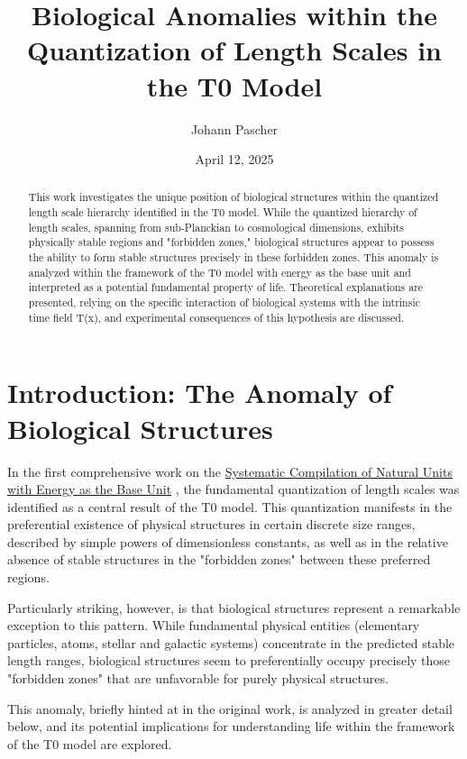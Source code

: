 \documentclass[12pt,a4paper]{article}
\title{Biological Anomalies within the\\Quantization of Length Scales in the T0 Model}
\author{Johann Pascher}
\date{April 12, 2025}
\newcommand{\Tfield}{T(x)}
\begin{document}
	
	\maketitle
	
	\begin{abstract}
		This work investigates the unique position of biological structures within the quantized length scale hierarchy identified in the T0 model. While the quantized hierarchy of length scales, spanning from sub-Planckian to cosmological dimensions, exhibits physically stable regions and "forbidden zones," biological structures appear to possess the ability to form stable structures precisely in these forbidden zones. This anomaly is analyzed within the framework of the T0 model with energy as the base unit and interpreted as a potential fundamental property of life. Theoretical explanations are presented, relying on the specific interaction of biological systems with the intrinsic time field \Tfield, and experimental consequences of this hypothesis are discussed.
	\end{abstract}
	
	\section{Introduction: The Anomaly of Biological Structures}
	\label{sec:introduction}
	
	In the first comprehensive work on the \href{https://github.com/jpascher/T0-Time-Mass-Duality/blob/main/2/pdf/English/NatEinheitenSystematikEn.pdf}{Systematic Compilation of Natural Units with Energy as the Base Unit} \cite{pascher_nateinheiten_2025}, the fundamental quantization of length scales was identified as a central result of the T0 model. This quantization manifests in the preferential existence of physical structures in certain discrete size ranges, described by simple powers of dimensionless constants, as well as in the relative absence of stable structures in the "forbidden zones" between these preferred regions.
	
	Particularly striking, however, is that biological structures represent a remarkable exception to this pattern. While fundamental physical entities (elementary particles, atoms, stellar and galactic systems) concentrate in the predicted stable length ranges, biological structures seem to preferentially occupy precisely those "forbidden zones" that are unfavorable for purely physical structures.
	
	This anomaly, briefly hinted at in the original work, is analyzed in greater detail below, and its potential implications for understanding life within the framework of the T0 model are explored.
	
\end{document}
